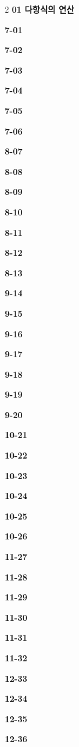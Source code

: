 \documentclass[10pt,a4paper]{article}
\begin{document}
\begin{multicols}{2}\small
\noindent\textbf{01 다항식의 연산}\par\smallskip
\noindent\textbf{7-01}\ \par
\noindent\textbf{7-02}\ \par
\noindent\textbf{7-03}\ \par
\noindent\textbf{7-04}\ \par
\noindent\textbf{7-05}\ \par
\noindent\textbf{7-06}\ \par
\noindent\textbf{8-07}\ \par
\noindent\textbf{8-08}\ \par
\noindent\textbf{8-09}\ \par
\noindent\textbf{8-10}\ \par
\noindent\textbf{8-11}\ \par
\noindent\textbf{8-12}\ \par
\noindent\textbf{8-13}\ \par
\noindent\textbf{9-14}\ \par
\noindent\textbf{9-15}\ \par
\noindent\textbf{9-16}\ \par
\noindent\textbf{9-17}\ \par
\noindent\textbf{9-18}\ \par
\noindent\textbf{9-19}\ \par
\noindent\textbf{9-20}\ \par
\noindent\textbf{10-21}\ \par
\noindent\textbf{10-22}\ \par
\noindent\textbf{10-23}\ \par
\noindent\textbf{10-24}\ \par
\noindent\textbf{10-25}\ \par
\noindent\textbf{10-26}\ \par
\noindent\textbf{11-27}\ \par
\noindent\textbf{11-28}\ \par
\noindent\textbf{11-29}\ \par
\noindent\textbf{11-30}\ \par
\noindent\textbf{11-31}\ \par
\noindent\textbf{11-32}\ \par
\noindent\textbf{12-33}\ \par
\noindent\textbf{12-34}\ \par
\noindent\textbf{12-35}\ \par
\noindent\textbf{12-36}\ \par

\end{multicols}
\end{document}
